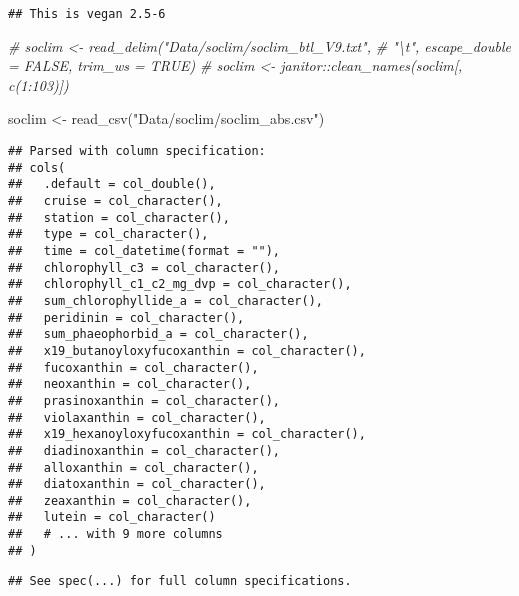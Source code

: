 \documentclass[
]{article}
\newenvironment{Shaded}{\begin{snugshade}}{\end{snugshade}}
\newcommand{\AttributeTok}[1]{\textcolor[rgb]{0.77,0.63,0.00}{#1}}
\newcommand{\CommentTok}[1]{\textcolor[rgb]{0.56,0.35,0.01}{\textit{#1}}}
\newcommand{\FunctionTok}[1]{\textcolor[rgb]{0.00,0.00,0.00}{#1}}
\newcommand{\NormalTok}[1]{#1}
\newcommand{\OtherTok}[1]{\textcolor[rgb]{0.56,0.35,0.01}{#1}}
\newcommand{\SpecialCharTok}[1]{\textcolor[rgb]{0.00,0.00,0.00}{#1}}
\newcommand{\StringTok}[1]{\textcolor[rgb]{0.31,0.60,0.02}{#1}}
\begin{document}
\begin{verbatim}
## This is vegan 2.5-6
\end{verbatim}

\begin{Shaded}
\begin{Highlighting}[]
\CommentTok{\# soclim \textless{}{-} read\_delim("Data/soclim/soclim\_btl\_V9.txt", }
\CommentTok{\#            "\textbackslash{}t", escape\_double = FALSE, trim\_ws = TRUE)}
\CommentTok{\# soclim \textless{}{-} janitor::clean\_names(soclim[, c(1:103)])}


\NormalTok{soclim }\OtherTok{\textless{}{-}} \FunctionTok{read\_csv}\NormalTok{(}\StringTok{"Data/soclim/soclim\_abs.csv"}\NormalTok{)}
\end{Highlighting}
\end{Shaded}

\begin{verbatim}
## Parsed with column specification:
## cols(
##   .default = col_double(),
##   cruise = col_character(),
##   station = col_character(),
##   type = col_character(),
##   time = col_datetime(format = ""),
##   chlorophyll_c3 = col_character(),
##   chlorophyll_c1_c2_mg_dvp = col_character(),
##   sum_chlorophyllide_a = col_character(),
##   peridinin = col_character(),
##   sum_phaeophorbid_a = col_character(),
##   x19_butanoyloxyfucoxanthin = col_character(),
##   fucoxanthin = col_character(),
##   neoxanthin = col_character(),
##   prasinoxanthin = col_character(),
##   violaxanthin = col_character(),
##   x19_hexanoyloxyfucoxanthin = col_character(),
##   diadinoxanthin = col_character(),
##   alloxanthin = col_character(),
##   diatoxanthin = col_character(),
##   zeaxanthin = col_character(),
##   lutein = col_character()
##   # ... with 9 more columns
## )
\end{verbatim}

\begin{verbatim}
## See spec(...) for full column specifications.
\end{verbatim}

\begin{Shaded}
\end{Shaded}
\end{document}
